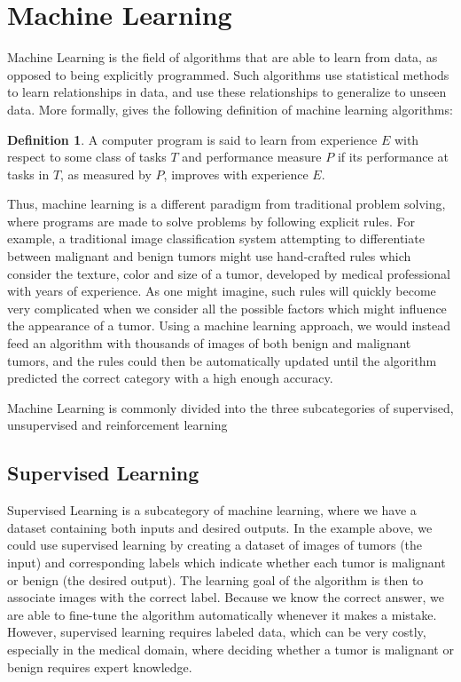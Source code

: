 \documentclass[UKenglish]{uiomasterthesis} %
\theoremstyle{definition}
\newtheorem*{definition}{Definition}
\begin{document}
\section{Machine Learning}

Machine Learning is the field of algorithms that are able to learn from data, as opposed to being explicitly programmed. Such algorithms use statistical methods to learn relationships in data, and use these relationships to generalize to unseen data. More formally, \cite{mitchell} gives the following definition of machine learning algorithms:

\begin{definition}
A computer program is said to learn from experience $E$ with respect to some class of tasks $T$ and performance measure $P$ if its performance at tasks in $T$, as measured by $P$, improves with experience $E$.
\end{definition}

Thus, machine learning is a different paradigm from traditional problem solving, where programs are made to solve problems by following explicit rules. For example, a traditional image classification system attempting to differentiate between malignant and benign tumors might use hand-crafted rules which consider the texture, color and size of a tumor, developed by medical professional with years of experience. As one might imagine, such rules will quickly become very complicated when we consider all the possible factors which might influence the appearance of a tumor. Using a machine learning approach, we would instead feed an algorithm with thousands of images of both benign and malignant tumors, and the rules could then be automatically updated until the algorithm predicted the correct category with a high enough accuracy.

Machine Learning is commonly divided into the three subcategories of supervised, unsupervised and reinforcement learning

\subsection{Supervised Learning}

Supervised Learning is a subcategory of machine learning, where we have a dataset containing both inputs and desired outputs. In the example above, we could use supervised learning by creating a dataset of images of tumors (the input) and corresponding labels which indicate whether each tumor is malignant or benign (the desired output). The learning goal of the algorithm is then to associate images with the correct label. Because we know the correct answer, we are able to fine-tune the algorithm automatically whenever it makes a mistake. However, supervised learning requires labeled data, which can be very costly, especially in the medical domain, where deciding whether a tumor is malignant or benign requires expert knowledge.
\end{document}
